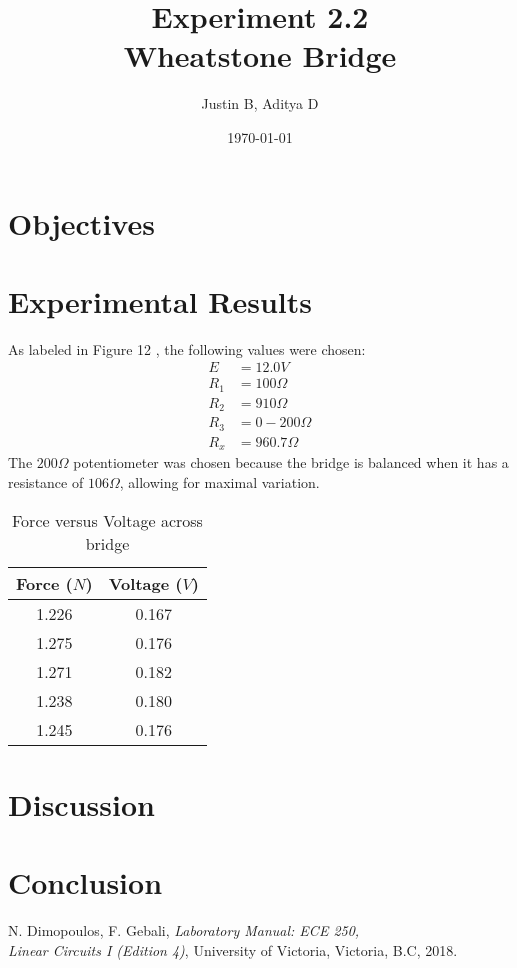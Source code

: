 \documentclass[12pt]{article}
\begin{document}
\title{Experiment 2.2 \\ Wheatstone Bridge}
\author{Justin B, Aditya D}
\date{\today}
\maketitle

\newpage
\tableofcontents
\newpage 
{}

\section{Objectives}
\section{Experimental Results}
As labeled in Figure 12 \cite{labManual}, the following values were chosen:
\begin{align*}
    E   &= 12.0V \\
    R_1 &= 100\Omega \\
    R_2 &= 910\Omega \\
    R_3 &= 0\!-\!200\Omega \\
    R_x &= 960.7\Omega 
\end{align*}
The \(200\Omega\) potentiometer was chosen because the bridge is balanced when it has a resistance of \(106\Omega\), allowing for maximal variation.

\begin{table}[h]
\centering
\begin{tabular}{c | c }
    Force (\(N\)) & Voltage (\(V\)) \\
    \hline
    1.226 & 0.167 \\
    1.275 & 0.176 \\
    1.271 & 0.182 \\
    1.238 & 0.180 \\
    1.245 & 0.176 \\
\end{tabular}
\caption{Force versus Voltage across bridge}
\label{table:1}
\end{table}

\section{Discussion}
\section{Conclusion}

\newpage
{}
\begin{thebibliography}{1}
    N. Dimopoulos, F. Gebali, \textit{Laboratory Manual: ECE 250, \\ Linear Circuits I (Edition 4)}, University of Victoria, Victoria, B.C, 2018.
\end{thebibliography}
\end{document}
